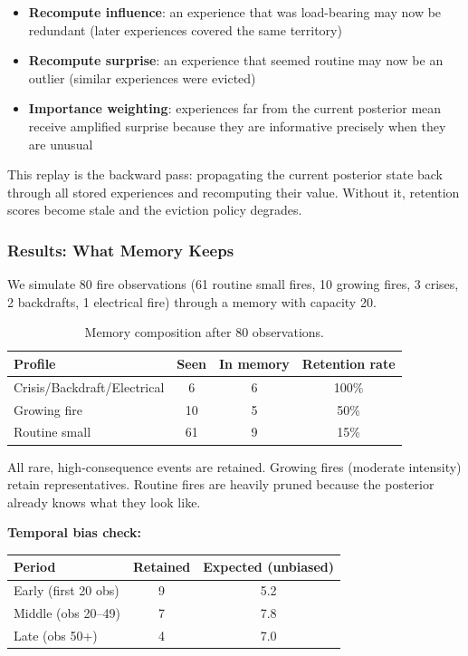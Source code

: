\documentclass[11pt]{article}
\begin{document}
\begin{itemize}
    \item \textbf{Recompute influence}: an experience that was load-bearing may now be redundant (later experiences covered the same territory)
    \item \textbf{Recompute surprise}: an experience that seemed routine may now be an outlier (similar experiences were evicted)
    \item \textbf{Importance weighting}: experiences far from the current posterior mean receive amplified surprise because they are informative precisely when they are unusual
\end{itemize}

This replay is the backward pass: propagating the current posterior state back through all stored experiences and recomputing their value. Without it, retention scores become stale and the eviction policy degrades.

\subsubsection{Results: What Memory Keeps}

We simulate 80 fire observations (61 routine small fires, 10 growing fires, 3 crises, 2 backdrafts, 1 electrical fire) through a memory with capacity 20.

\begin{table}[h]
\centering
\caption{Memory composition after 80 observations.}
\label{tab:memorycomp}
\begin{tabular}{lccc}
\toprule
\textbf{Profile} & \textbf{Seen} & \textbf{In memory} & \textbf{Retention rate} \\
\midrule
Crisis/Backdraft/Electrical & 6 & 6 & 100\% \\
Growing fire & 10 & 5 & 50\% \\
Routine small & 61 & 9 & 15\% \\
\bottomrule
\end{tabular}
\end{table}

All rare, high-consequence events are retained. Growing fires (moderate intensity) retain representatives. Routine fires are heavily pruned because the posterior already knows what they look like.

\textbf{Temporal bias check:}

\begin{table}[h]
\centering
\begin{tabular}{lcc}
\toprule
\textbf{Period} & \textbf{Retained} & \textbf{Expected (unbiased)} \\
\midrule
Early (first 20 obs) & 9 & 5.2 \\
Middle (obs 20--49) & 7 & 7.8 \\
Late (obs 50+) & 4 & 7.0 \\
\bottomrule
\end{tabular}
\end{table}
\end{document}
